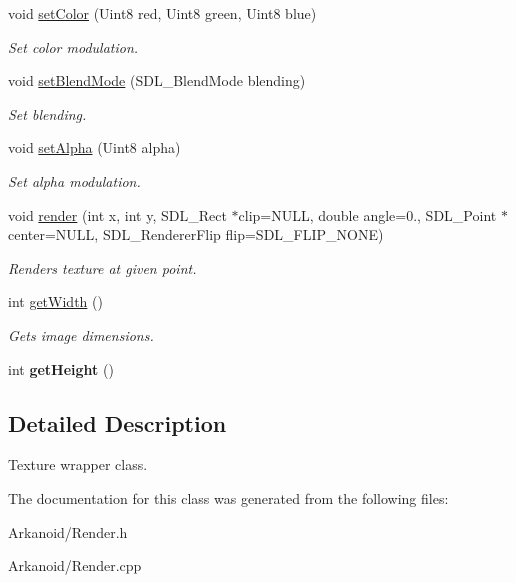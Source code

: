 \begin{DoxyCompactItemize}
\mbox{\label{class_l_texture_a4ccf201515ecb158b137394d41ed9077}} 
void \hyperlink{class_l_texture_a4ccf201515ecb158b137394d41ed9077}{set\+Color} (Uint8 red, Uint8 green, Uint8 blue)
\begin{DoxyCompactList}\small\item\em Set color modulation. \end{DoxyCompactList}\item 
\mbox{\label{class_l_texture_aa1fe07070f715bf3981c129ae1619a4e}} 
void \hyperlink{class_l_texture_aa1fe07070f715bf3981c129ae1619a4e}{set\+Blend\+Mode} (S\+D\+L\+\_\+\+Blend\+Mode blending)
\begin{DoxyCompactList}\small\item\em Set blending. \end{DoxyCompactList}\item 
\mbox{\label{class_l_texture_ab4e51b54752ae7b54614078f9128a9c0}} 
void \hyperlink{class_l_texture_ab4e51b54752ae7b54614078f9128a9c0}{set\+Alpha} (Uint8 alpha)
\begin{DoxyCompactList}\small\item\em Set alpha modulation. \end{DoxyCompactList}\item 
\mbox{\label{class_l_texture_af0d1f2a1562a976acc795f39e813fe95}} 
void \hyperlink{class_l_texture_af0d1f2a1562a976acc795f39e813fe95}{render} (int x, int y, S\+D\+L\+\_\+\+Rect $\ast$clip=N\+U\+LL, double angle=0., S\+D\+L\+\_\+\+Point $\ast$center=N\+U\+LL, S\+D\+L\+\_\+\+Renderer\+Flip flip=S\+D\+L\+\_\+\+F\+L\+I\+P\+\_\+\+N\+O\+NE)
\begin{DoxyCompactList}\small\item\em Renders texture at given point. \end{DoxyCompactList}\item 
\mbox{\label{class_l_texture_a542c1f81d98fd5659a04eb394d61a879}} 
int \hyperlink{class_l_texture_a542c1f81d98fd5659a04eb394d61a879}{get\+Width} ()
\begin{DoxyCompactList}\small\item\em Gets image dimensions. \end{DoxyCompactList}\item 
\mbox{\label{class_l_texture_a277f45af3dae7e35ca846a527039e59a}} 
int {\bfseries get\+Height} ()
\end{DoxyCompactItemize}


\subsection{Detailed Description}
Texture wrapper class. 

The documentation for this class was generated from the following files\+:\begin{DoxyCompactItemize}
\item 
Arkanoid/Render.\+h\item 
Arkanoid/Render.\+cpp\end{DoxyCompactItemize}
